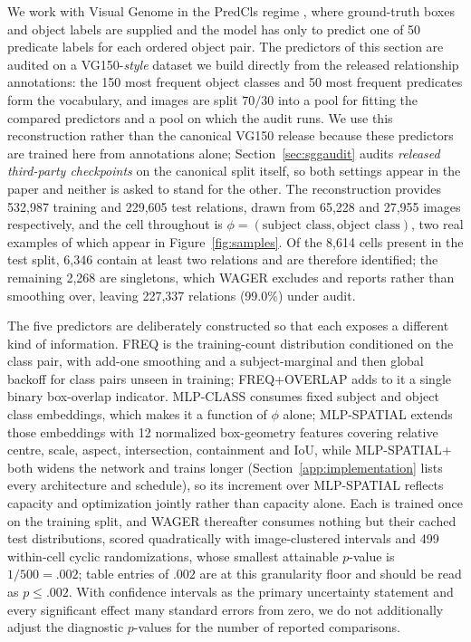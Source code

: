 We work with Visual Genome \cite{krishna2017visual} in the PredCls regime
\cite{xu2017scene}, where ground-truth boxes and object labels are supplied and
the model has only to predict one of 50 predicate labels for each ordered object pair.
The predictors of this section are audited on a VG150-\emph{style} dataset we build
directly from the released relationship annotations: the 150 most frequent object
classes and 50 most frequent predicates form the vocabulary, and images are split
$70/30$ into a pool for fitting the compared predictors and a pool on which the audit
runs. We use this reconstruction rather than the canonical VG150 release because these
predictors are trained here from annotations alone; Section~\ref{sec:sggaudit} audits
\emph{released third-party checkpoints} on the canonical split itself, so both settings
appear in the paper and neither is asked to stand for the other. The reconstruction
provides 532,987 training and 229,605 test relations, drawn from 65,228 and 27,955
images respectively, and the cell throughout is
$\phi=(\text{subject class},\text{object class})$, two real examples of which appear in
Figure~\ref{fig:samples}. Of the 8,614 cells present in the test split, 6,346 contain at
least two relations and are therefore identified; the remaining 2,268 are singletons,
which WAGER excludes and reports rather than smoothing over, leaving 227,337 relations
(99.0\%) under audit.

The five predictors are deliberately constructed so that each exposes a different kind
of information. FREQ is the training-count distribution conditioned on the class pair,
with add-one smoothing and a subject-marginal and then global backoff for class pairs
unseen in training; FREQ+OVERLAP adds to it a single binary box-overlap indicator.
MLP-CLASS consumes fixed subject and object class embeddings, which makes it a function
of $\phi$ alone; MLP-SPATIAL extends those embeddings with 12 normalized box-geometry
features covering relative centre, scale, aspect, intersection, containment and IoU,
while MLP-SPATIAL+ both widens the network and trains longer (Section~\ref{app:implementation} lists every architecture and schedule), so its increment over
MLP-SPATIAL reflects capacity and optimization jointly rather than capacity alone. Each
is trained once on the training split, and WAGER thereafter consumes nothing but their
cached test distributions, scored quadratically with image-clustered intervals and 499
within-cell cyclic randomizations, whose smallest attainable $p$-value is
$1/500=.002$; table entries of $.002$ are at this granularity floor and should be read
as $p\le.002$. With confidence intervals as the primary uncertainty statement and every
significant effect many standard errors from zero, we do not additionally adjust the
diagnostic $p$-values for the number of reported comparisons.

